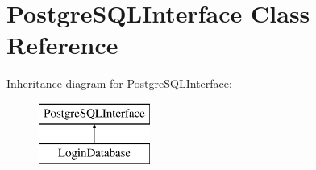 \hypertarget{class_postgre_s_q_l_interface}{\section{Postgre\-S\-Q\-L\-Interface Class Reference}
\label{class_postgre_s_q_l_interface}
}
Inheritance diagram for Postgre\-S\-Q\-L\-Interface\-:\begin{figure}[H]
\begin{center}
\leavevmode
\includegraphics[height=2.000000cm]{class_postgre_s_q_l_interface}
\end{center}
\end{figure}
